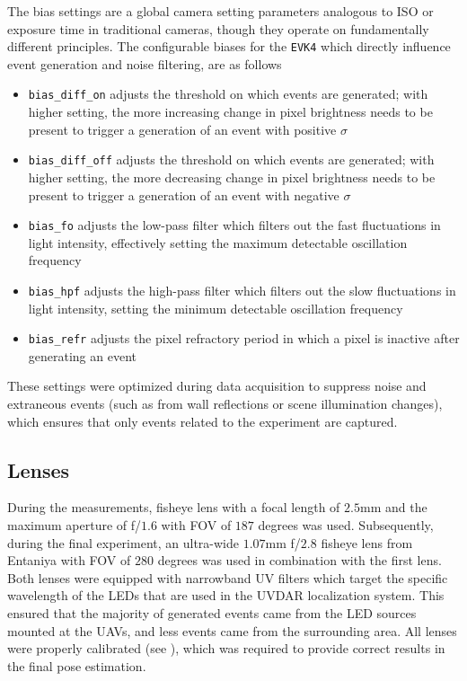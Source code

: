 The bias settings are a global camera setting parameters analogous to ISO or exposure time in traditional cameras, though they operate on fundamentally
different principles.
The configurable biases for the \texttt{EVK4} which directly influence event generation and noise filtering, are as follows~\cite{dilmaghani2022controlevaluationeventcameras}
\begin{itemize}
    \item \texttt{bias\_diff\_on} adjusts the threshold on which events are generated; with higher setting, the more increasing change in pixel brightness needs to be present to trigger a generation of an event with positive $\sigma$
    \item \texttt{bias\_diff\_off} adjusts the threshold on which events are generated; with higher setting, the more decreasing change in pixel brightness needs to be present to trigger a generation of an event with negative $\sigma$
    \item \texttt{bias\_fo} adjusts the low-pass filter which filters out the fast fluctuations in light intensity, effectively setting the maximum detectable oscillation frequency
    \item \texttt{bias\_hpf} adjusts the high-pass filter which filters out the slow fluctuations in light intensity, setting the minimum detectable oscillation frequency
    \item \texttt{bias\_refr} adjusts the pixel refractory period in which a pixel is inactive after generating an event
\end{itemize}
These settings were optimized during data acquisition to suppress noise and extraneous events (such as from wall reflections or scene illumination changes), which
ensures that only events related to the experiment are captured.

\subsection{Lenses}
During the measurements, fisheye lens with a focal length of $2.5$mm and the maximum aperture of f/$1.6$ with \ac{FOV} of $187$ degrees was used. Subsequently, during the final experiment, an ultra-wide $1.07$mm f/$2.8$ fisheye lens from Entaniya with \ac{FOV} of $280$ degrees was used in combination with the first lens.
Both lenses were equipped with narrowband \ac{UV} filters which target the specific wavelength of the \ac{LED}s that are used in the UVDAR localization system.
This ensured that the majority of generated events came from the \ac{LED} sources mounted at the \ac{UAV}s, and less events came from the surrounding area.
All lenses were properly calibrated (see ), which was required to provide correct results in the final pose estimation.

